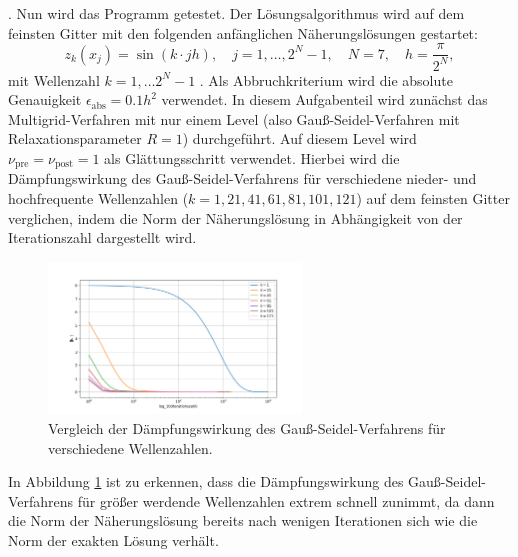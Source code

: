 \documentclass[11pt,a4paper]{article}
\begin{document}
. Nun wird das Programm getestet. Der Lösungsalgorithmus wird auf dem feinsten Gitter mit den folgenden anfänglichen Näherungslösungen gestartet:
\begin{equation*}
    z_k(x_j) = \sin{(k \cdot j h)} , \quad j = 1 , \dots , 2^N - 1 , \quad N = 7 , \quad h = \frac{\pi}{2^N} ,
\end{equation*} mit Wellenzahl $k = 1 , \dots 2^N - 1$ . Als Abbruchkriterium wird die absolute Genauigkeit $\epsilon_{\mathrm{abs}} = 0.1 h^2$ verwendet. In diesem Aufgabenteil wird zunächst das Multigrid-Verfahren mit nur einem Level (also Gauß-Seidel-Verfahren mit Relaxationsparameter $R=1$) durchgeführt.
Auf diesem Level wird $\nu_{\mathrm{pre}} = \nu_{\mathrm{post}} = 1$ als Glättungsschritt verwendet. Hierbei wird die Dämpfungswirkung des Gauß-Seidel-Verfahrens für verschiedene nieder- und hochfrequente Wellenzahlen ($k = 1, 21, 41, 61, 81, 101, 121$) auf dem feinsten Gitter verglichen,
indem die Norm der Näherungslösung in Abhängigkeit von der Iterationszahl dargestellt wird.
\begin{figure}[htbp]
    \centering
    \includegraphics[width=0.6\textwidth,scale=0.7]{h1_comparison_plot_1}
    \caption[Vergleich der Dämpfungswirkung des Gauß-Seidel-Verfahrens für verschiedene Wellenzahlen.]{Vergleich der Dämpfungswirkung des Gauß-Seidel-Verfahrens für verschiedene Wellenzahlen.}\label{fig:h1_comparison_plot_1}
\end{figure} In Abbildung \ref{fig:h1_comparison_plot_1} ist zu erkennen, dass die Dämpfungswirkung des Gauß-Seidel-Verfahrens für größer werdende Wellenzahlen extrem schnell zunimmt, da dann die Norm der Näherungslösung bereits nach wenigen Iterationen sich wie die Norm der exakten Lösung verhält.\newline
\end{document}
